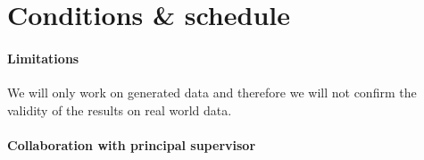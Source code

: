 \documentclass{kththesis}
\begin{document}




\section{Conditions \& schedule}



\paragraph*{Limitations}

We will only work on generated data and therefore we will not confirm the validity of the results on real world data.


\paragraph*{Collaboration with principal supervisor}
\end{document}
